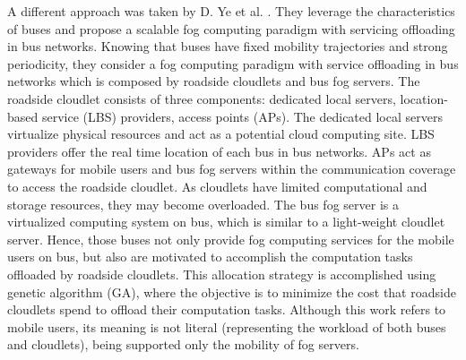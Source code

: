 \noindent\tab A different approach was taken by D. Ye et al. \cite{ye2016scalable}. They leverage the characteristics of buses and propose a scalable fog computing paradigm with servicing offloading in bus networks. Knowing that buses have fixed mobility trajectories and strong periodicity, they consider a fog computing paradigm with service offloading in bus networks which is composed by roadside cloudlets and bus fog servers. The roadside cloudlet consists of three components: dedicated local servers, location-based service (LBS) providers, access points (APs). The dedicated local servers virtualize physical resources and act as a potential cloud computing site. LBS providers offer the real time location of each bus in bus networks. APs act as gateways for mobile users and bus fog servers within the communication coverage to access the roadside cloudlet. As cloudlets have limited computational and storage resources, they may become overloaded. The bus fog server is a virtualized computing system on bus, which is similar to a light-weight cloudlet server. Hence, those buses not only provide fog computing services for the mobile users on bus, but also are motivated to accomplish the computation tasks offloaded by roadside cloudlets. This allocation strategy is accomplished using genetic algorithm (GA), where the objective is to minimize the cost that roadside cloudlets spend to offload their computation tasks. Although this work refers to mobile users, its meaning is not literal (representing the workload of both buses and cloudlets), being supported only the mobility of fog servers.

